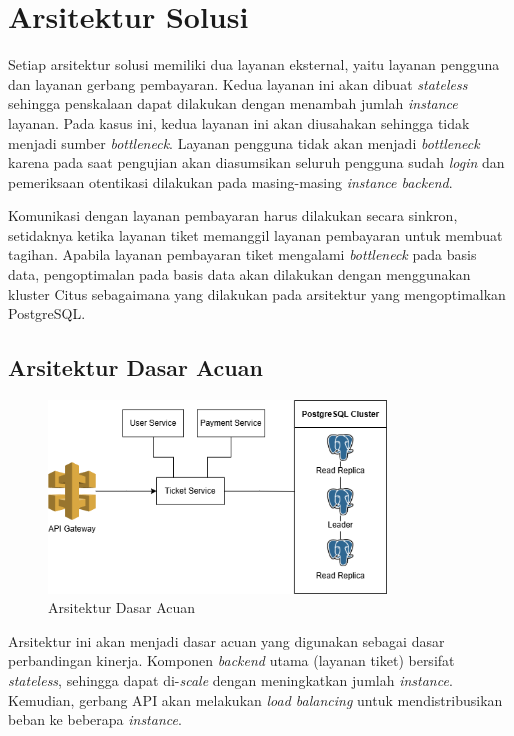 \chapter{Arsitektur Solusi}

Setiap arsitektur solusi memiliki dua layanan eksternal, yaitu layanan pengguna dan layanan gerbang pembayaran. Kedua layanan ini akan dibuat \textit{stateless} sehingga penskalaan dapat dilakukan dengan menambah jumlah \textit{instance} layanan. Pada kasus ini, kedua layanan ini akan diusahakan sehingga tidak menjadi sumber \textit{bottleneck}. Layanan pengguna tidak akan menjadi \textit{bottleneck} karena pada saat pengujian akan diasumsikan seluruh pengguna sudah \textit{login} dan pemeriksaan otentikasi dilakukan pada masing-masing \textit{instance backend}.

Komunikasi dengan layanan pembayaran harus dilakukan secara sinkron, setidaknya ketika layanan tiket memanggil layanan pembayaran untuk membuat tagihan. Apabila layanan pembayaran tiket mengalami \textit{bottleneck} pada basis data, pengoptimalan pada basis data akan dilakukan dengan menggunakan kluster Citus sebagaimana yang dilakukan pada arsitektur yang mengoptimalkan PostgreSQL.

\section{Arsitektur Dasar Acuan}

\begin{figure}[ht]
    \centering
    \includegraphics[width=0.8\textwidth]{resources/chapter-3/architecture-reference.png}
    \caption{Arsitektur Dasar Acuan}
    \label{fig:baseline-architecture}
\end{figure}

Arsitektur ini akan menjadi dasar acuan yang digunakan sebagai dasar perbandingan kinerja. Komponen \textit{backend} utama (layanan tiket) bersifat \textit{stateless}, sehingga dapat di-\textit{scale} dengan meningkatkan jumlah \textit{instance}. Kemudian, gerbang API akan melakukan \textit{load balancing} untuk mendistribusikan beban ke beberapa \textit{instance}.

